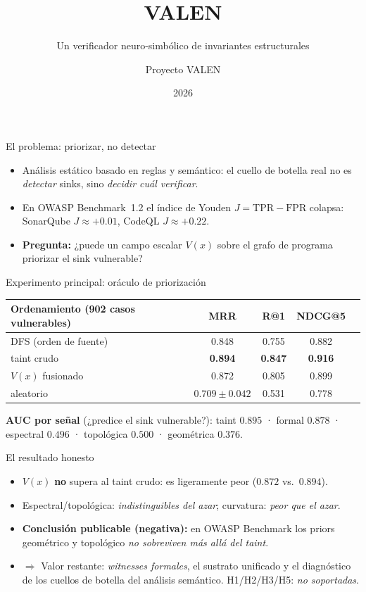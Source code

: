 \documentclass[aspectratio=169,11pt]{beamer}
\title[VALEN]{VALEN}
\subtitle{Un verificador neuro-simbólico de invariantes estructurales}
\author{Proyecto VALEN}
\institute{IR tipada $\cdot$ invariantes de autorización $\cdot$ homología dirigida $\cdot$ witnesses Z3}
\date{2026}
\begin{document}
\begin{frame}
  \titlepage
\end{frame}

\begin{frame}{El problema: priorizar, no detectar}
  \begin{itemize}
    \item Análisis estático basado en reglas y semántico: el cuello de botella real no
          es \emph{detectar} sinks, sino \emph{decidir cuál verificar}.
    \item En OWASP Benchmark~1.2 el índice de Youden $J=\mathrm{TPR}-\mathrm{FPR}$ colapsa:
          SonarQube $J\approx+0.01$, CodeQL $J\approx+0.22$.
    \item \textbf{Pregunta:} ¿puede un campo escalar $V(x)$ sobre el grafo de
          programa priorizar el sink vulnerable?
  \end{itemize}
\end{frame}

\begin{frame}{Experimento principal: oráculo de priorización}
  \begin{center}
  \small
  \begin{tabular}{lcccc}
  \toprule
  Ordenamiento (902 casos vulnerables) & MRR & R@1 & NDCG@5 \\
  \midrule
  DFS (orden de fuente) & 0.848 & 0.755 & 0.882 \\
  taint crudo & \textbf{0.894} & \textbf{0.847} & \textbf{0.916} \\
  $V(x)$ fusionado & 0.872 & 0.805 & 0.899 \\
  aleatorio & $0.709\pm0.042$ & 0.531 & 0.778 \\
  \bottomrule
  \end{tabular}
  \end{center}
  \vspace{1mm}
  \textbf{AUC por señal} (¿predice el sink vulnerable?):
  taint $0.895$ · formal $0.878$ · espectral $0.496$ ·
  topológica $0.500$ · geométrica $\mathbf{0.376}$.
\end{frame}

\begin{frame}{El resultado honesto}
  \begin{itemize}
    \item $V(x)$ \textbf{no} supera al taint crudo: es ligeramente peor ($0.872$ vs.\ $0.894$).
    \item Espectral/topológica: \emph{indistinguibles del azar}; curvatura: \emph{peor que el azar}.
    \item \textbf{Conclusión publicable (negativa):} en OWASP Benchmark los priors
          geométrico y topológico \emph{no sobreviven más allá del taint}.
    \item $\Rightarrow$ Valor restante: \emph{witnesses formales}, el sustrato
          unificado y el diagnóstico de los cuellos de botella del análisis semántico.
          H1/H2/H3/H5: \emph{no soportadas}.
  \end{itemize}
\end{frame}
\end{document}
